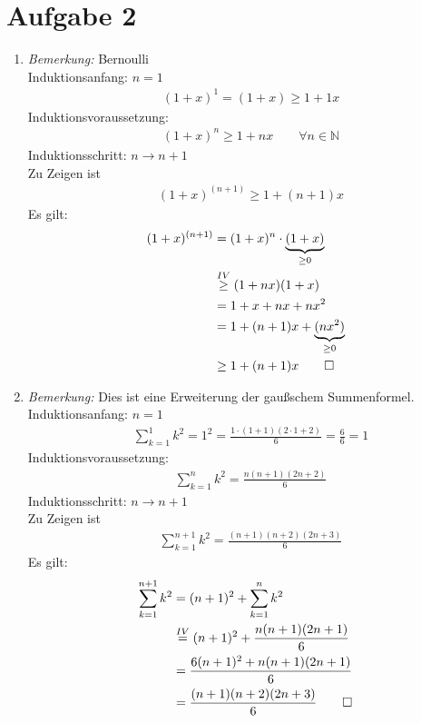 \section{Aufgabe 2}
    \begin{enumerate}[label={\alph*)}]
      \item
      \textit{Bemerkung:} Bernoulli\\
      Induktionsanfang: $n=1$ \begin{align}&(1+x)^{1}=(1+x) \geq 1+1x\end{align}
      Induktionsvoraussetzung: \begin{align}&(1+x)^{n} \geq 1+nx\qquad \forall n \in \mathbb{N}\end{align}
      Induktionsschritt: $n\rightarrow n+1$ \\
      Zu Zeigen ist \begin{align}&(1+x)^{(n+1)} \geq 1+(n+1)x\end{align}
      Es gilt: \begin{align}(1+x)^{(n+1)}& =(1+x)^n\cdot \underbrace{(1+x)}_{\geq0}\\ &\overset{IV}{\geq}(1+nx)(1+x)\\ &=1+x+nx+nx^2\\ &=1+(n+1)x+\underbrace{(nx^2)}_{\geq0}\\ &\geq 1+(n+1)x\qed\end{align}
      \item
      \textit{Bemerkung:} Dies ist eine Erweiterung der gaußschem Summenformel.\\
      Induktionsanfang: $n=1$ \begin{align}&\sum_{k=1}^{1}k^2=1^2=\frac{1\cdot (1+1)(2\cdot 1+2)}{6}=\frac{6}{6}=1\end{align}
      Induktionsvoraussetzung: \begin{align}&\sum_{k=1}^{n}k^2=\frac{n(n+1)(2n+2)}{6}\end{align}
      Induktionsschritt: $n\rightarrow n+1$ \\
      Zu Zeigen ist \begin{align}&\sum_{k=1}^{n+1}k^2=\frac{(n+1)(n+2)(2n+3)}{6}\end{align}
      Es gilt: \begin{align}\sum_{k=1}^{n+1}k^2& =(n+1)^2+\sum_{k=1}^{n}k^2\\ &\overset{IV}{=}(n+1)^2+\frac{n(n+1)(2n+1)}{6}\\ &=\frac{6(n+1)^2+n(n+1)(2n+1)}{6}\\ &=\frac{(n+1)(n+2)(2n+3)}{6}\qed\end{align}
    \end{enumerate}

